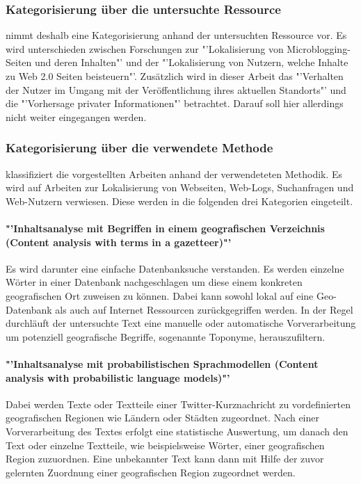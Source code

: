 		\subsubsection{Kategorisierung über die untersuchte Ressource}
		\cite{Hecht2011} nimmt deshalb eine Kategorisierung anhand der untersuchten Ressource vor. 
		Es wird unterschieden zwischen Forschungen zur "'Lokalisierung von Microblogging-Seiten und deren Inhalten"' und der "'Lokalisierung von Nutzern, welche Inhalte zu Web 2.0 Seiten beisteuern"'. 
		Zusätzlich wird in dieser Arbeit das "'Verhalten der Nutzer im Umgang mit der Veröffentlichung ihres aktuellen Standorts"' und die "'Vorhersage privater Informationen"' betrachtet. Darauf soll hier allerdings nicht weiter eingegangen werden.      

		\subsubsection{Kategorisierung über die verwendete Methode}

		\cite{Cheng2010} klassifiziert die vorgestellten Arbeiten anhand der verwendeteten Methodik. 
		Es wird auf Arbeiten zur Lokalisierung von Webseiten, Web-Logs, Suchanfragen und Web-Nutzern verwiesen. 
		Diese werden in die folgenden drei Kategorien eingeteilt.

		\paragraph*{"'Inhaltsanalyse mit Begriffen in einem geografischen Verzeichnis (Content analysis with terms in a gazetteer)"'}  
		Es wird darunter eine einfache Datenbanksuche verstanden. 
		Es werden einzelne Wörter in einer Datenbank nachgeschlagen um diese einem konkreten geografischen Ort zuweisen zu können.
		Dabei kann sowohl lokal auf eine Geo-Datenbank als auch auf Internet Ressourcen zurückgegriffen werden.  
		In der Regel durchläuft der untersuchte Text eine manuelle oder automatische Vorverarbeitung um potenziell geografische Begriffe, sogenannte Toponyme, herauszufiltern. 

		\paragraph*{"'Inhaltsanalyse mit probabilistischen Sprachmodellen (Content analysis with probabilistic language models)"'}
		Dabei werden Texte oder Textteile einer Twitter-Kurznachricht zu vordefinierten geografischen Regionen wie Ländern oder Städten zugeordnet. 
		Nach einer Vorverarbeitung des Textes erfolgt eine statistische Auswertung, um danach den Text oder einzelne Textteile, wie beispielsweise Wörter, einer geografischen Region zuzuordnen. 
		Eine unbekannter Text kann dann mit Hilfe der zuvor gelernten Zuordnung einer geografischen Region zugeordnet werden.

